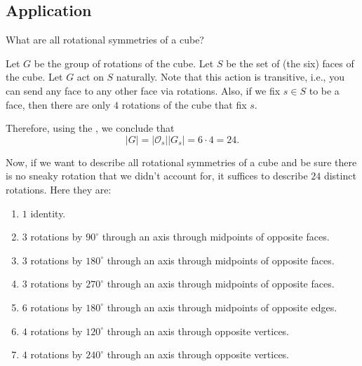 
\subsection*{Application}

\begin{que}{}{}
  What are all rotational symmetries of a cube?
\end{que}

Let \(G\) be the group of rotations of the cube.
Let \(S\) be the set of (the six) faces of the cube.
Let \(G\) act on \(S\) naturally.
Note that this action is transitive, i.e., you can send any face to any other face via rotations.
Also, if we fix \(s \in S\) to be a face, then there are only \(4\) rotations of the cube that fix \(s\).

Therefore, using the , we conclude that \[
  |G| = |\mathcal{O}_s| |G_s| = 6 \cdot 4 = 24.
\] 

Now, if we want to describe all rotational symmetries of a cube and be sure there is no sneaky rotation that we didn't account for, it suffices to describe \(24\) distinct rotations. Here they are:
\begin{enumerate}[label = \textbullet]
  \item \(1\) identity.
  \item \(3\) rotations by \(90^\circ\) through an axis through midpoints of opposite faces.
  \item \(3\) rotations by \(180^\circ\) through an axis through midpoints of opposite faces.
  \item \(3\) rotations by \(270^\circ\) through an axis through midpoints of opposite faces.
  \item \(6\) rotations by \(180^\circ\) through an axis through midpoints of opposite edges.
  \item \(4\) rotations by \(120^\circ\) through an axis through opposite vertices.
  \item \(4\) rotations by \(240^\circ\) through an axis through opposite vertices.
\end{enumerate}
